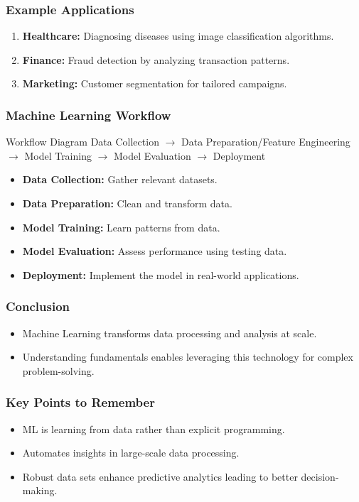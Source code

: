 \documentclass[aspectratio=169]{beamer}
\begin{document}
\begin{frame}[fragile]
    \frametitle{Example Applications}
    \begin{enumerate}
        \item \textbf{Healthcare:} Diagnosing diseases using image classification algorithms.
        \item \textbf{Finance:} Fraud detection by analyzing transaction patterns.
        \item \textbf{Marketing:} Customer segmentation for tailored campaigns.
    \end{enumerate}
\end{frame}

\begin{frame}[fragile]
    \frametitle{Machine Learning Workflow}
    \begin{block}{Workflow Diagram}
    \centering
    Data Collection $\rightarrow$ Data Preparation/Feature Engineering $\rightarrow$ Model Training $\rightarrow$ Model Evaluation $\rightarrow$ Deployment
    \end{block}
    \begin{itemize}
        \item \textbf{Data Collection:} Gather relevant datasets.
        \item \textbf{Data Preparation:} Clean and transform data.
        \item \textbf{Model Training:} Learn patterns from data.
        \item \textbf{Model Evaluation:} Assess performance using testing data.
        \item \textbf{Deployment:} Implement the model in real-world applications.
    \end{itemize}
\end{frame}

\begin{frame}[fragile]
    \frametitle{Conclusion}
    \begin{itemize}
        \item Machine Learning transforms data processing and analysis at scale.
        \item Understanding fundamentals enables leveraging this technology for complex problem-solving.
    \end{itemize}
\end{frame}

\begin{frame}[fragile]
    \frametitle{Key Points to Remember}
    \begin{itemize}
        \item ML is learning from data rather than explicit programming.
        \item Automates insights in large-scale data processing.
        \item Robust data sets enhance predictive analytics leading to better decision-making.
    \end{itemize}
\end{frame}
\end{document}
